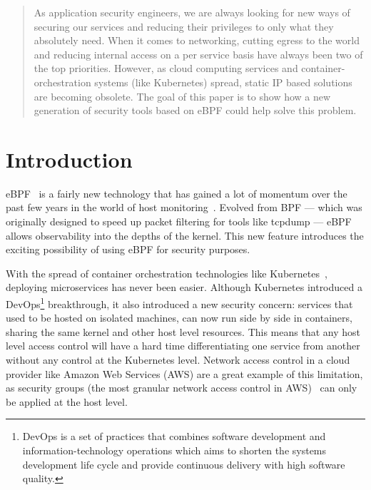 


\maketitle
{}

\begin{abstract}
  As application security engineers, we are always looking for new ways of securing our services and reducing their privileges to only what they absolutely need. When it comes to networking, cutting egress to the world and reducing internal access on a per service basis have always been two of the top priorities. However, as cloud computing services and container-orchestration systems (like Kubernetes) spread, static IP based solutions are becoming obsolete. The goal of this paper is to show how a new generation of security tools based on eBPF could help solve this problem.
\end{abstract}

\section{Introduction}

eBPF~\cite{ProcessLevelNetworkSecurityMonitoring:LorenzoFontanaDavidCalavera,ProcessLevelNetworkSecurityMonitoring:GregMarsden} is a fairly new technology that has gained a lot of momentum over the past few years in the world of host monitoring~\cite{ProcessLevelNetworkSecurityMonitoring:BrendanGregg}. Evolved from BPF — which was originally designed to speed up packet filtering for tools like tcpdump — eBPF allows observability into the depths of the kernel. This new feature introduces the exciting possibility of using eBPF for security purposes.

With the spread of container orchestration technologies like Kubernetes~\cite{ProcessLevelNetworkSecurityMonitoring:JohnArundelJustinDomingus}, deploying microservices has never been easier. Although Kubernetes introduced a DevOps\footnote{DevOps is a set of practices that combines software development and information-technology operations which aims to shorten the systems development life cycle and provide continuous delivery with high software quality.} breakthrough, it also introduced a new security concern: services that used to be hosted on isolated machines, can now run side by side in containers, sharing the same kernel and other host level resources. This means that any host level access control will have a hard time differentiating one service from another without any control at the Kubernetes level. Network access control in a cloud provider like Amazon Web Services (AWS) are a great example of this limitation, as security groups (the most granular network access control in AWS)~\cite{ProcessLevelNetworkSecurityMonitoring:HeartinKanikathottu} can only be applied at the host level.

